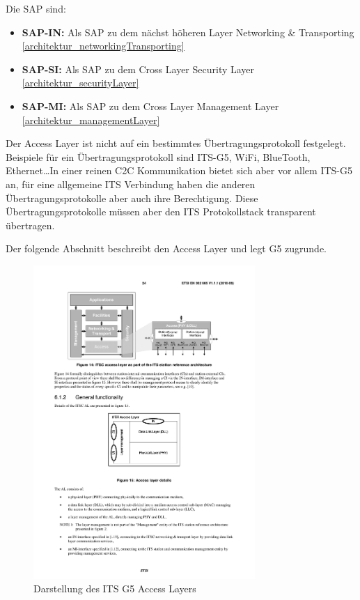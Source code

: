 Die \ac{SAP} sind:
\begin{itemize}
	\item \textbf{SAP-IN: } Als \ac{SAP} zu dem nächst höheren Layer  Networking \& Transporting \ref{architektur_networkingTransporting}
	\item \textbf{SAP-SI: } Als \ac{SAP} zu dem Cross Layer Security Layer \ref{architektur_securityLayer}
	\item \textbf{SAP-MI: } Als \ac{SAP} zu dem Cross Layer Management Layer \ref{architektur_managementLayer}
\end{itemize}


Der Access Layer ist nicht auf ein bestimmtes Übertragungsprotokoll festgelegt. Beispiele für ein Übertragungsprotokoll sind ITS-G5, WiFi, BlueTooth, Ethernet\dots In einer reinen \ac{C2C} Kommunikation bietet sich aber vor allem ITS-G5 an, für eine allgemeine \ac{ITS} Verbindung haben die anderen Übertragungsprotokolle aber auch ihre Berechtigung. Diese Übertragungsprotokolle müssen aber den \ac{ITS} Protokollstack transparent übertragen. 

Der folgende Abschnitt beschreibt den Access Layer und legt G5 zugrunde.
 
\begin{figure}
	\includegraphics[width=0.75\textwidth]{content/images/02_architektur/accessLayer.pdf}
	\caption{Darstellung des ITS G5 Access Layers \cite{en302665}}
	\label{fig:architektur_accessLayer}
\end{figure}

